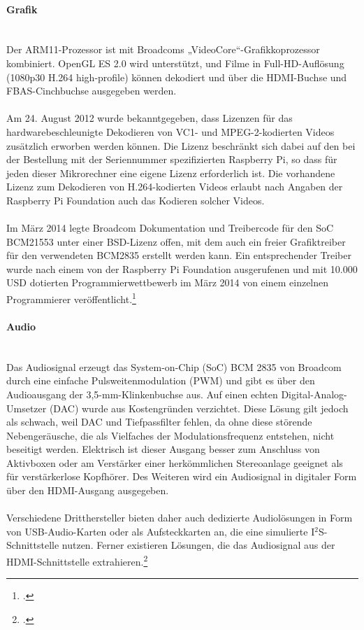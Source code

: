 \paragraph{Grafik}\ \\
Der ARM11-Prozessor ist mit Broadcoms „VideoCore“-Grafikkoprozessor kombiniert. OpenGL ES 2.0 wird unterstützt, und Filme in Full-HD-Auflösung (1080p30 H.264 high-profile) können dekodiert und über die HDMI-Buchse und FBAS-Cinchbuchse ausgegeben werden.\\
\\
Am 24. August 2012 wurde bekanntgegeben, dass Lizenzen für das hardwarebeschleunigte Dekodieren von VC1- und MPEG-2-kodierten Videos zusätzlich erworben werden können. Die Lizenz beschränkt sich dabei auf den bei der Bestellung mit der Seriennummer spezifizierten Raspberry Pi, so dass für jeden dieser Mikrorechner eine eigene Lizenz erforderlich ist. Die vorhandene Lizenz zum Dekodieren von H.264-kodierten Videos erlaubt nach Angaben der Raspberry Pi Foundation auch das Kodieren solcher Videos.\\
\\
Im März 2014 legte Broadcom Dokumentation und Treibercode für den SoC BCM21553 unter einer BSD-Lizenz offen, mit dem auch ein freier Grafiktreiber für den verwendeten BCM2835 erstellt werden kann. Ein entsprechender Treiber wurde nach einem von der Raspberry Pi Foundation ausgerufenen und mit 10.000 USD dotierten Programmierwettbewerb im März 2014 von einem einzelnen Programmierer veröffentlicht.\footcite{shit_raspi}

\paragraph{Audio}\ \\

Das Audiosignal erzeugt das System-on-Chip (SoC) BCM 2835 von Broadcom durch eine einfache Pulsweitenmodulation (PWM) und gibt es über den Audioausgang der 3,5-mm-Klinkenbuchse aus. Auf einen echten Digital-Analog-Umsetzer (DAC) wurde aus Kostengründen verzichtet. Diese Lösung gilt jedoch als schwach, weil DAC und Tiefpassfilter fehlen, da ohne diese störende Nebengeräusche, die als Vielfaches der Modulationsfrequenz entstehen, nicht beseitigt werden. Elektrisch ist dieser Ausgang besser zum Anschluss von Aktivboxen oder am Verstärker einer herkömmlichen Stereoanlage geeignet als für verstärkerlose Kopfhörer. Des Weiteren wird ein Audiosignal in digitaler Form über den HDMI-Ausgang ausgegeben.\\
\\
Verschiedene Dritthersteller bieten daher auch dedizierte Audiolösungen in Form von USB-Audio-Karten oder als Aufsteckkarten an, die eine simulierte I$^2$S-Schnittstelle nutzen. Ferner existieren Lösungen, die das Audiosignal aus der HDMI-Schnittstelle extrahieren.\footcite{shit_raspi}

